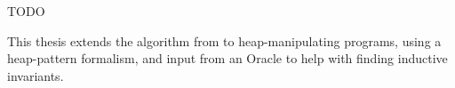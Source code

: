 \label{ch:intro}

TODO

This thesis extends the \impact algorithm from \cite{mcmillan06} to heap-manipulating programs, using a heap-pattern formalism, and input from an Oracle to help with finding inductive invariants.

